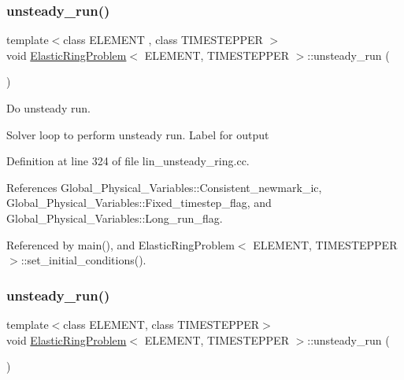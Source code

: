 \subsubsection{\texorpdfstring{unsteady\+\_\+run()}{unsteady\_run()}\hspace{0.1cm}{\footnotesize\ttfamily [1/2]}}
{\footnotesize\ttfamily template$<$class E\+L\+E\+M\+E\+NT , class T\+I\+M\+E\+S\+T\+E\+P\+P\+ER $>$ \\
void \hyperlink{classElasticRingProblem}{Elastic\+Ring\+Problem}$<$ E\+L\+E\+M\+E\+NT, T\+I\+M\+E\+S\+T\+E\+P\+P\+ER $>$\+::unsteady\+\_\+run (\begin{DoxyParamCaption}{ }\end{DoxyParamCaption})}



Do unsteady run. 

Solver loop to perform unsteady run. Label for output 

Definition at line 324 of file lin\+\_\+unsteady\+\_\+ring.\+cc.



References Global\+\_\+\+Physical\+\_\+\+Variables\+::\+Consistent\+\_\+newmark\+\_\+ic, Global\+\_\+\+Physical\+\_\+\+Variables\+::\+Fixed\+\_\+timestep\+\_\+flag, and Global\+\_\+\+Physical\+\_\+\+Variables\+::\+Long\+\_\+run\+\_\+flag.



Referenced by main(), and Elastic\+Ring\+Problem$<$ E\+L\+E\+M\+E\+N\+T, T\+I\+M\+E\+S\+T\+E\+P\+P\+E\+R $>$\+::set\+\_\+initial\+\_\+conditions().

\mbox{\label{classElasticRingProblem_acd30c4363ffedbaadc1523aa8b85523b}} 
\subsubsection{\texorpdfstring{unsteady\+\_\+run()}{unsteady\_run()}\hspace{0.1cm}{\footnotesize\ttfamily [2/2]}}
{\footnotesize\ttfamily template$<$class E\+L\+E\+M\+E\+NT, class T\+I\+M\+E\+S\+T\+E\+P\+P\+ER$>$ \\
void \hyperlink{classElasticRingProblem}{Elastic\+Ring\+Problem}$<$ E\+L\+E\+M\+E\+NT, T\+I\+M\+E\+S\+T\+E\+P\+P\+ER $>$\+::unsteady\+\_\+run (\begin{DoxyParamCaption}{ }\end{DoxyParamCaption})}



